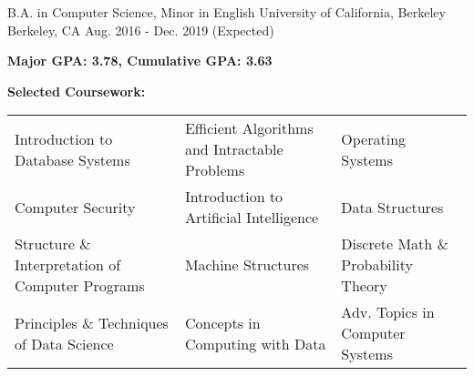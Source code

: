 

\begin{cventries}

  \cventry
    {B.A. in Computer Science, Minor in English} %
    {University of California, Berkeley} %
    {Berkeley, CA} %
    {Aug. 2016 - Dec. 2019 (Expected)} %
    {
      \begin{cvitems}
        \item \textbf{Major GPA: 3.78, Cumulative GPA: 3.63}
        \item \textbf{Selected Coursework:}
      \end{cvitems}
      \vspace{5mm}
      \hspace{2.8mm}
      \begin{tabular}{p{7cm} p{7cm} p{7cm}}
        Introduction to Database Systems & Efficient Algorithms and Intractable Problems & Operating Systems \\
        Computer Security & Introduction to Artificial Intelligence & Data Structures \\
        Structure \& Interpretation of Computer Programs & Machine Structures & Discrete Math \& Probability Theory \\
        Principles \& Techniques of Data Science & Concepts in Computing with Data & Adv. Topics in Computer Systems \\
      \end{tabular}
    }
\end{cventries}
